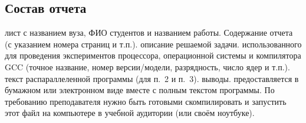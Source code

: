 \subsection{Состав отчета}
\begin{enumerate}
     лист с названием вуза, ФИО студентов и названием работы. Содержание отчета (с указанием номера страниц и т.п.).
     описание решаемой задачи.
     использованного для проведения экспериментов процессора, операционной системы и компилятора GCC (точное название, номер версии/модели, разрядность, число ядер и т.п.).
     текст распараллеленной программы (для п.~2 и п.~3).
     выводы.
     предоставляется в бумажном или электронном виде вместе с полным текстом программы. По требованию преподавателя нужно быть готовыми скомпилировать и запустить этот файл на компьютере в учебной аудитории (или своём ноутбуке).
\end{enumerate}

